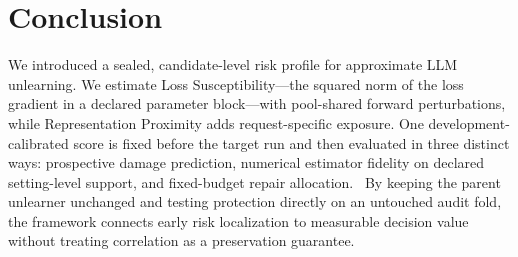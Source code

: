 \section{Conclusion}
\label{sec:conclusion}

We introduced a sealed, candidate-level risk profile for approximate LLM
unlearning. We estimate Loss Susceptibility---the squared norm of the loss
gradient in a declared parameter block---with pool-shared forward
perturbations, while
Representation Proximity adds
request-specific exposure. One development-calibrated score is fixed before
the target run and then evaluated in three distinct ways: prospective damage
prediction, numerical estimator fidelity on declared setting-level support,
and fixed-budget repair allocation.
\ConclusionHeadline\ By keeping the parent unlearner unchanged and testing protection directly on
an untouched audit fold, the framework connects early risk localization to
measurable decision value without treating correlation as a preservation
guarantee.
